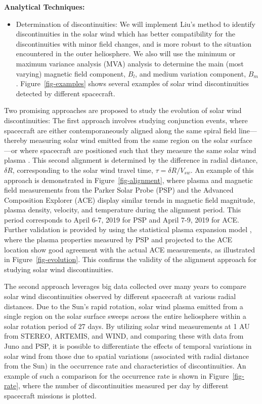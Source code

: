 \documentclass[
  letterpaper,
  DIV=11,
  numbers=noendperiod]{scrartcl}
\providecommand{\tightlist}{%
  \setlength{\itemsep}{0pt}\setlength{\parskip}{0pt}}\usepackage{longtable,booktabs,array}
\begin{document}
\textbf{Analytical Techniques:}

\begin{itemize}
\tightlist
\item
  Determination of discontinuities: We will implement Liu's \citep{liuMagneticDiscontinuitiesSolar2022} method to identify discontinuities in the solar wind which has better compatibility for the discontinuities with minor field changes, and is more robust to the situation encountered in the outer heliosphere. We also will use the minimum or maximum variance analysis (MVA) analysis \citep{sonnerupMinimumMaximumVariance1998, sonnerupMagnetopauseStructureAttitude1967} to determine the main (most varying) magnetic field component, \(B_l\), and medium variation component, \(B_m\). Figure~\ref{fig-examples} shows several examples of solar wind discontinuities detected by different spacecraft.
\end{itemize}

Two promising approaches are proposed to study the evolution of solar wind discontinuities: The first approach involves studying conjunction events, where spacecraft are either contemporaneously aligned along the same spiral field line---thereby measuring solar wind emitted from the same region on the solar surface---or where spacecraft are positioned such that they measure the same solar wind plasma \citep{velliUnderstandingOriginsHeliosphere2020}. This second alignment is determined by the difference in radial distance, \(\delta R\), corresponding to the solar wind travel time, \(\tau = \delta R / V_{sw}\). An example of this approach is demonstrated in Figure~\ref{fig-alignment}, where plasma and magnetic field measurements from the Parker Solar Probe (PSP) and the Advanced Composition Explorer (ACE) display similar trends in magnetic field magnitude, plasma density, velocity, and temperature during the alignment period. This period corresponds to April 6-7, 2019 for PSP and April 7-9, 2019 for ACE. Further validation is provided by using the statistical plasma expansion model \citep{perroneRadialEvolutionSolar2019}, where the plasma properties measured by PSP and projected to the ACE location show good agreement with the actual ACE measurements, as illustrated in Figure~\ref{fig-evolution}. This confirms the validity of the alignment approach for studying solar wind discontinuities.

The second approach leverages big data collected over many years to compare solar wind discontinuities observed by different spacecraft at various radial distances. Due to the Sun's rapid rotation, solar wind plasma emitted from a single region on the solar surface sweeps across the entire heliosphere within a solar rotation period of 27 days. By utilizing solar wind measurements at 1 AU from STEREO, ARTEMIS, and WIND, and comparing these with data from Juno and PSP, it is possible to differentiate the effects of temporal variations in solar wind from those due to spatial variations (associated with radial distance from the Sun) in the occurrence rate and characteristics of discontinuities. An example of such a comparison for the occurrence rate is shown in Figure~\ref{fig-rate}, where the number of discontinuities measured per day by different spacecraft missions is plotted.
\end{document}
